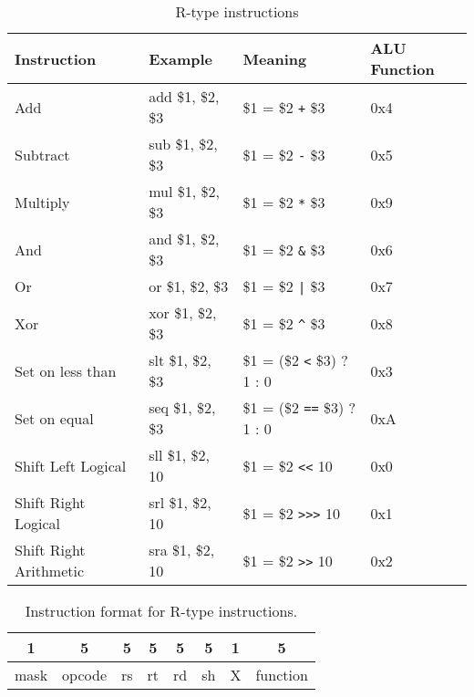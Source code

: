 \documentclass[../main/report.tex]{subfiles}
\begin{document}
\begin{table}[H]
    \begin{tabular}{llll}
    \textbf{Instruction}   & \textbf{Example}  & \textbf{Meaning}          & \textbf{ALU Function} \\
    \hline
    \hline
    Add                    & add \$1, \$2, \$3 & \$1 = \$2 \verb/+/ \$3    & 0x4          \\
    Subtract               & sub \$1, \$2, \$3 & \$1 = \$2 \verb/-/ \$3    & 0x5          \\
    Multiply               & mul \$1, \$2, \$3 & \$1 = \$2 \verb/*/ \$3    & 0x9          \\ \hline
    And                    & and \$1, \$2, \$3 & \$1 = \$2 \verb/&/ \$3    & 0x6          \\
    Or                     & or \$1, \$2, \$3  & \$1 = \$2 \verb/|/ \$3    & 0x7          \\
    Xor                    & xor \$1, \$2, \$3 & \$1 = \$2 \verb/^/ \$3    & 0x8          \\ \hline
    Set on less than       & slt \$1, \$2, \$3 & \$1 = (\$2 \verb/</ \$3) ? 1 : 0 & 0x3   \\
    Set on equal           & seq \$1, \$2, \$3 & \$1 = (\$2 \verb/==/ \$3) ? 1 : 0 & 0xA  \\ \hline
    Shift Left Logical     & sll \$1, \$2, 10  & \$1 = \$2 \verb/<</ 10    & 0x0          \\
    Shift Right Logical    & srl \$1, \$2, 10  & \$1 = \$2 \verb/>>>/ 10   & 0x1          \\
    Shift Right Arithmetic & sra \$1, \$2, 10  & \$1 = \$2 \verb/>>/ 10    & 0x2          \\
    \end{tabular}
    \caption{R-type instructions}
    \label{table:r_type_instructions}
\end{table}

\begin{table}[H]
    \centering
    \begin{tabular}{|c|c|c|c|c|c|c|c|}
    \multicolumn{1}{c}{1} & \multicolumn{1}{c}{5} & \multicolumn{1}{c}{5}  & \multicolumn{1}{c}{5}  & \multicolumn{1}{c}{5} & \multicolumn{1}{c}{5} & \multicolumn{1}{c}{1} & \multicolumn{1}{c}{5}    \\ \hline
    mask & opcode & rs & rt & rd & sh & X & function \\ \hline
    \end{tabular}
    \caption{Instruction format for R-type instructions.}
    \label{table:r_type_format}
\end{table}
\end{document}

